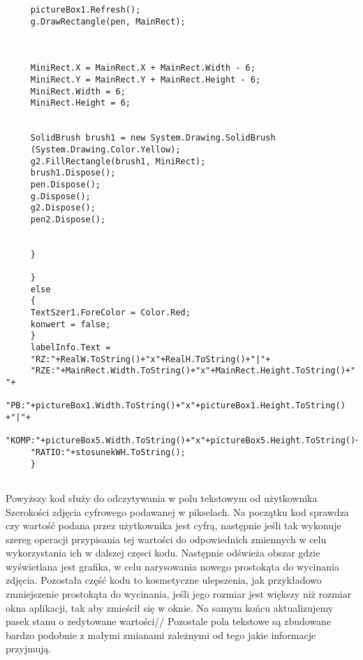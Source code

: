 \begin{itemize}
\begin{lstlisting}
	 pictureBox1.Refresh();
	 g.DrawRectangle(pen, MainRect);
	 
	 
	 
	 MiniRect.X = MainRect.X + MainRect.Width - 6;
	 MiniRect.Y = MainRect.Y + MainRect.Height - 6;
	 MiniRect.Width = 6;
	 MiniRect.Height = 6;
	 
	 
	 SolidBrush brush1 = new System.Drawing.SolidBrush
	 (System.Drawing.Color.Yellow);
	 g2.FillRectangle(brush1, MiniRect);
	 brush1.Dispose();
	 pen.Dispose();
	 g.Dispose();
	 g2.Dispose();
	 pen2.Dispose();
	 
	 
	 }
	 
	 }
	 else
	 {
	 TextSzer1.ForeColor = Color.Red;
	 konwert = false;
	 }
	 labelInfo.Text =
	 "RZ:"+RealW.ToString()+"x"+RealH.ToString()+"|"+
	 "RZE:"+MainRect.Width.ToString()+"x"+MainRect.Height.ToString()+" "+
	 "PB:"+pictureBox1.Width.ToString()+"x"+pictureBox1.Height.ToString() +"|"+
	 "KOMP:"+pictureBox5.Width.ToString()+"x"+pictureBox5.Height.ToString()+"|"+
	 "RATIO:"+stosunekWH.ToString();
	 }
	 
	\end{lstlisting}
Powyższy kod służy do odczytywania w polu tekstowym od użytkownika Szerokości zdjęcia cyfrowego podawanej w pikselach. Na początku kod sprawdza czy wartość podana przez użytkownika jest cyfrą, następnie jeśli tak wykonuje szereg operacji przypisania tej wartości do odpowiednich zmiennych w celu wykorzystania ich w dalszej częsci kodu. Następnie odświeża obszar gdzie wyświetlana jest grafika, w celu narysowania nowego prostokąta do wycinania zdjęcia. Pozostała część kodu to kosmetyczne ulepszenia, jak przykładowo zmniejszenie prostokąta do wycinania, jeśli jego rozmiar jest większy niż rozmiar okna aplikacji, tak aby zmieścił się w oknie. Na samym końcu aktualizujemy pasek stanu o zedytowane wartości//
Pozostale pola tekstowe są zbudowane bardzo podobnie z małymi zmianami zależnymi od tego jakie informacje przyjmują.
\end{itemize}

